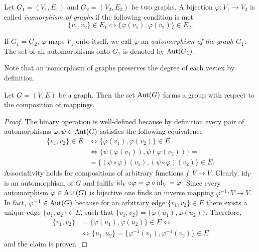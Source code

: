 \begin{defin}
\begin{thmlist}
\item Let $G_1=(V_1,E_1)$ and $G_2=(V_2,E_2)$ be two graphs. A bijection $\varphi\colon V_1 \to V_2$ is called \emph{isomorphism of graphs} if the following condition is met
\begin{equation*}
\lbrace v_1,v_2\rbrace\in E_1 \Leftrightarrow \lbrace \varphi(v_1),\varphi(v_2)\rbrace\in E_2.
\end{equation*}
\item If $G_1=G_2$, \ie{} $\varphi$ maps $V_1$ onto itself, we call $\varphi$ an \emph{automorphism of the graph $G_1$.} The set of all automorphisms onto $G_1$ is denoted by $\operatorname{Aut}(G_1)$.
\end{thmlist}
\end{defin}
\begin{rem}
Note that an isomorphism of graphs preserves the degree of each vertex by definition.
\end{rem}
\begin{thm}\label{thm:Graph-Automorphisms Form a Group}
Let $G=(V,E)$ be a graph. Then the set $\operatorname{Aut}(G)$ forms a group with respect to the composition of mappings.
\end{thm}
\begin{proof}
The binary operation is well-defined because by definition every pair of automorphisms $\varphi,\psi\in\operatorname{Aut}(G)$ satisfies the following equivalence
\begin{align*}
\lbrace v_1,v_2\rbrace\in E&\Leftrightarrow\lbrace \varphi(v_1),\varphi(v_2)\rbrace\in E\\
&\Leftrightarrow\lbrace \psi(\varphi(v_1)),\psi(\varphi(v_2))\rbrace=\\
&=\lbrace (\psi\circ\varphi)(v_1),(\psi\circ\varphi)(v_2)\rbrace\in E.
\end{align*}
Associativity holds for compositions of arbitrary functions $f\colon V\to V$. Clearly, $\operatorname{id}_V$ is an automorphism of $G$ and fulfils $\operatorname{id}_V\circ\varphi=\varphi\circ\operatorname{id}_V=\varphi$. Since every automorphism $\varphi\in\operatorname{Aut}(G)$ is bijective one finds an inverse mapping $\varphi^{-1}\colon V\to V$. In fact, $\varphi^{-1}\in\operatorname{Aut}(G)$ because for an arbitrary edge $\lbrace v_1,v_2\rbrace\in E$ there exists a unique edge $\lbrace u_1,u_2\rbrace\in E$, such that $\lbrace v_1,v_2\rbrace=\lbrace \varphi(u_1),\varphi(u_2)\rbrace$. Therefore,
\begin{align*}
\lbrace v_1,v_2\rbrace&=\lbrace \varphi(u_1),\varphi(u_2)\rbrace\in E\Leftrightarrow\\
&\Leftrightarrow \lbrace u_1,u_2\rbrace=\lbrace \varphi^{-1}(v_1),\varphi^{-1}(v_2)\rbrace\in E
\end{align*}
and the claim is proven.
\end{proof}